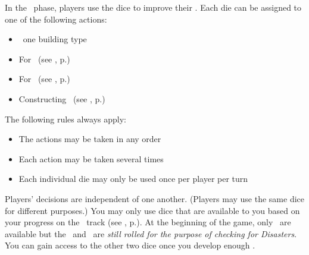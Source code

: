 In the \development\ phase, players use the dice to improve their \planets. Each die can be assigned to one of the following actions:
\begin{itemize}
	\item \activating\ one building type
	\item For \trade\ (see , p.\pageref{sec:trade})
	\item For \culture\ (see , p.\pageref{sec:culture})
  \item Constructing \fortifications\ (see , p.\pageref{sec:fortifications})
\end{itemize}
The following rules always apply:
\begin{itemize}
	\item The actions may be taken in any order
	\item Each action may be taken several times
	\item Each individual die may only be used once per player per turn
\end{itemize}
Players’ decisions are independent of one another. (Players may use the same dice for different purposes.)
\newline\newline
You may only use dice that are available to you based on your progress on the \tech\ track (see , p.\pageref{sec:technology}).  At the beginning of the game, only \whitedice\ are available but the \bluedie\ and \blackdie\ are \textit{still rolled for the purpose of checking for Disasters}.  You can gain access to the other two dice once you develop enough \tech.
